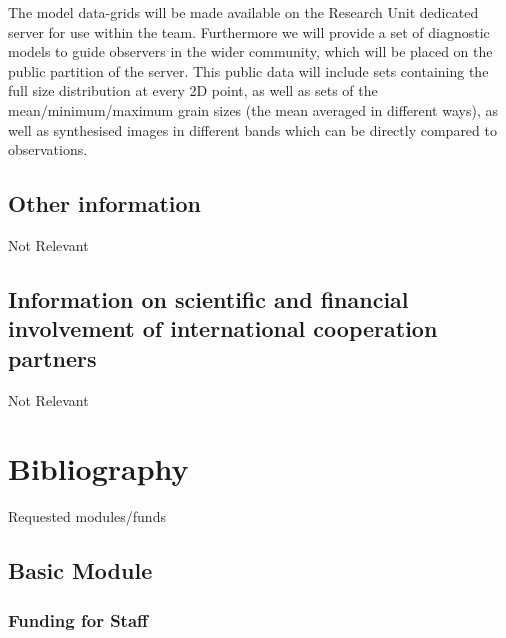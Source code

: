 \documentclass[10pt,fleqn,twoside]{article}
\newcommand{\Tcol}{\color{blue}}
\begin{document}
The model data-grids will be made available on the Research Unit
dedicated server for use within the team. Furthermore we will provide
a set of diagnostic models to guide observers in the wider community,
which will be placed 
on the public partition of the server.
This public data will include sets containing the full size
distribution at every 2D point, as well as sets of the
mean/minimum/maximum grain sizes (the mean averaged in different
ways), as well as synthesised images in different bands which can be
directly compared to observations. 

\subsection{\Tcol Other information}

Not Relevant

\subsection{\Tcol Information on scientific and financial involvement of international cooperation partners}

Not Relevant

\section{\Tcol Bibliography}

\begingroup
\renewcommand{\section}[2]{}%


\endgroup

\section{\Tcol Requested modules/funds}
\renewcommand{\leftmark}{\sc  Requested modules/funds}

\subsection{\Tcol Basic Module}

\subsubsection{\Tcol Funding for Staff}
\end{document}
